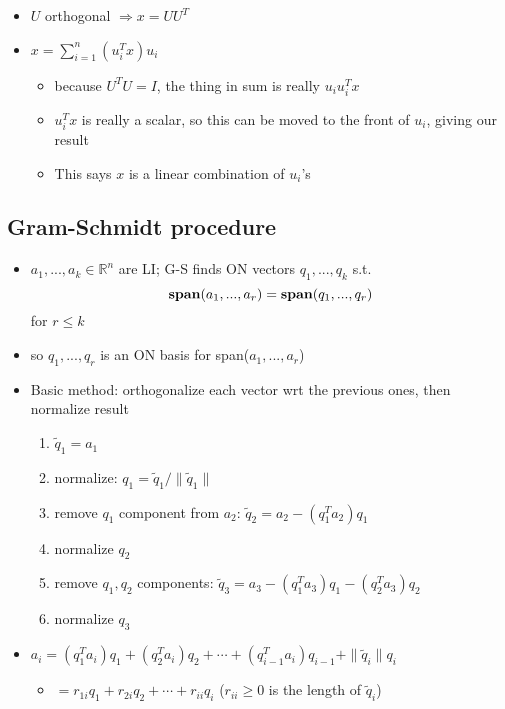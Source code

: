 \documentclass[10pt,letterpaper]{article}
\begin{document}
\begin{itemize}
\item $U$ orthogonal $\Rightarrow x=UU^T$
\item $\displaystyle x= \sum ^{n} _{i=1} \left( u ^{T} _{i} x\right) u _{i}$

\begin{itemize}
\item because $U^TU=I$, the thing in sum is really $u_i u_i^T x$
\item $u_i^T x$ is really a scalar, so this can be moved to the front of $u_i$, giving our result
\item This says $x$ is a linear combination of $u_i$'s
\end{itemize}

\end{itemize}
\subsection{Gram-Schmidt procedure}
\label{sec-3_4}

\begin{itemize}
\item $a_1, ..., a_k \in \mathbb{R}^{n}$ are LI; G-S finds ON vectors $q_1,..., q_k$ s.t. $$ {\bf span} (a_1,...,a_r)= {\bf span} (q_1,...,q_r)$$ for $r \le k$
\item so $q_1, ..., q_r$ is an ON basis for span($a_1, ...,a_r$)
\item Basic method: orthogonalize each vector wrt the previous ones, then normalize result

\begin{enumerate}
\item $\tilde q_1 = a_1$
\item normalize: $q_1 = \tilde q_1/ \|\tilde q_1 \|$
\item remove $q_1$ component from $a_2$: $\tilde q_2 = a_2 - (q_1^T a_2) q_1$
\item normalize $q_2$
\item remove $q_1, q_2$ components: $\tilde q_3= a_3 - (q_1^T a_3) q_1 - (q_2^T a_3)q_2$
\item normalize $q_3$
\end{enumerate}

\item $a_i= (q_1^T a_i) q_1 + (q_2^T a_i)q_2 + \cdots + (q_{i-1}^T a_i)q_{i-1} + \| \tilde q_i \| q_i$

\begin{itemize}
\item $= r_{1i} q_1 + r_{2i} q_2 + \cdots + r_{ii} q_i$ ($r_{ii} \ge 0$ is the length of $\tilde q_i$)
\end{itemize}

\end{itemize}
\end{document}
